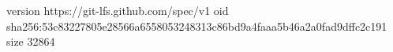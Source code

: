 version https://git-lfs.github.com/spec/v1
oid sha256:53c83227805e28566a6558053248313c86bd9a4faaa5b46a2a0fad9dffc2c191
size 32864

